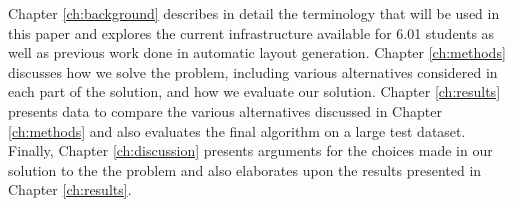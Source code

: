 Chapter \ref{ch:background} describes in detail the terminology that will be
used in this paper and explores the current infrastructure available for
6.01 students as well as previous work done in automatic layout generation.
Chapter \ref{ch:methods} discusses how we solve the problem, including various
alternatives considered in each part of the solution, and how we evaluate
our solution. Chapter \ref{ch:results} presents data to compare the various
alternatives discussed in Chapter \ref{ch:methods} and also evaluates the final
algorithm on a large test dataset. Finally, Chapter \ref{ch:discussion}
presents arguments for the choices made in our solution to the the problem and
also elaborates upon the results presented in Chapter \ref{ch:results}.

%

